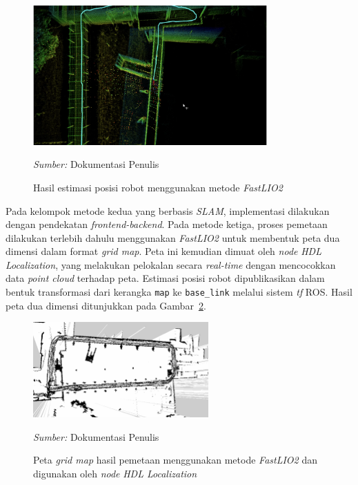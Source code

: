 \begin{figure}[H]
  \centering
  \includegraphics[width=0.8\textwidth]{gambar/bab3/fastlio2-result.png}
  \caption{Hasil estimasi posisi robot menggunakan metode \emph{FastLIO2}}
  \label{fig:fastlio2-result}
  \footnotesize{\emph{Sumber:} Dokumentasi Penulis}
\end{figure}

Pada kelompok metode kedua yang berbasis \emph{SLAM}, implementasi dilakukan dengan pendekatan \emph{frontend-backend}. Pada metode ketiga, proses pemetaan dilakukan terlebih dahulu menggunakan \emph{FastLIO2} untuk membentuk peta dua dimensi dalam format \emph{grid map}. Peta ini kemudian dimuat oleh \emph{node} \emph{HDL Localization}, yang melakukan pelokalan secara \emph{real-time} dengan mencocokkan data \emph{point cloud} terhadap peta. Estimasi posisi robot dipublikasikan dalam bentuk transformasi dari kerangka \texttt{map} ke \texttt{base\_link} melalui sistem \emph{tf} ROS. Hasil peta dua dimensi ditunjukkan pada Gambar~\ref{fig:pgm}.

\begin{figure}[H]
  \centering
  \includegraphics[width=0.6\textwidth]{gambar/bab3/pgm.png}
  \caption{Peta \emph{grid map} hasil pemetaan menggunakan metode \emph{FastLIO2} dan digunakan oleh \emph{node} \emph{HDL Localization}}
  \label{fig:pgm}
  \footnotesize{\emph{Sumber:} Dokumentasi Penulis}
\end{figure}

